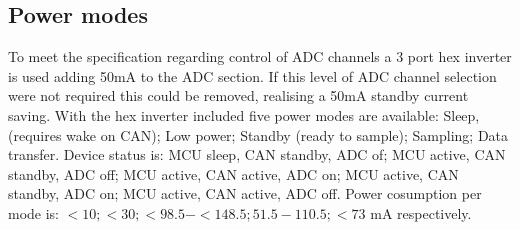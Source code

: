 \subsection{Power modes}
To meet the specification regarding control of ADC channels a 3 port hex inverter is used adding 50mA to the ADC section. If this level of ADC channel selection were not required this could be removed, realising a 50mA standby current saving. With the hex inverter included five power modes are available: Sleep, (requires wake on CAN); Low power; Standby (ready to sample); Sampling; Data transfer.
Device status is: MCU sleep, CAN standby, ADC of; MCU active, CAN standby, ADC off; MCU active, CAN active, ADC on; MCU active, CAN standby, ADC on; MCU active, CAN active, ADC off.
Power cosumption per mode is: $<10; <30; <98.5 - <148.5; 51.5 - 110.5; <73$ mA  respectively.
